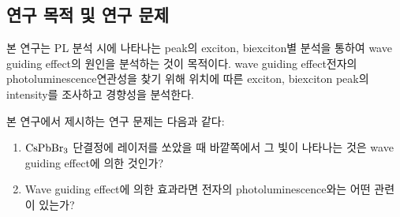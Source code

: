 \subsection{연구 목적 및 연구 문제}
본 연구는 PL 분석 시에 나타나는 peak의 exciton, biexciton별 분석을 통하여 wave guiding effect의 원인을 분석하는 것이 목적이다. wave guiding effect\와 전자의 photoluminescence 연관성을 찾기 위해 위치에 따른 exciton, biexciton peak의 intensity를 조사하고 경향성을 분석한다.

본 연구에서 제시하는 연구 문제는 다음과 같다:
\begin{enumerate}
	\item $\rm CsPbBr_3$ 단결정에 레이저를 쏘았을 때 바깥쪽에서 그 빛이 나타나는 것은 wave guiding effect에 의한 것인가?
	\item Wave guiding effect에 의한 효과라면 전자의 photoluminescence와는 어떤 관련이 있는가? 
\end{enumerate}

